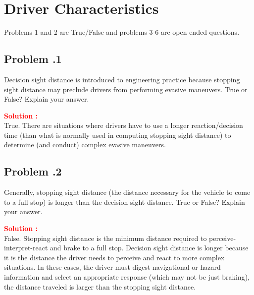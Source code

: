 \documentclass[12pt]{article}
\newcommand{\customsubsection}[1]{
  \subsection*{Problem \thesection.#1}
}
\begin{document}

\section{Driver Characteristics}
Problems 1 and 2 are True/False and problems 3-6 are open ended questions.


\customsubsection{1}
Decision sight distance is introduced to engineering practice because stopping sight distance may preclude drivers from performing evasive maneuvers. True or False? Explain your answer. 


\textbf{\textcolor{red}{Solution :}} \\
True. There are situations where drivers have to use a longer reaction/decision time (than what is normally used in computing stopping sight distance) to determine (and conduct) complex evasive maneuvers. 
\newpage

\customsubsection{2}
Generally, stopping sight distance (the distance necessary for the vehicle to come to a full stop) is longer than the decision sight distance. True or False? Explain your answer. 


\textbf{\textcolor{red}{Solution :}} \\
False. Stopping sight distance is the minimum distance required to perceive-interpret-react and brake to a full stop. Decision sight distance is longer because it is the distance the driver needs to perceive and react to more complex situations. In these cases, the driver must digest navigational or hazard information and select an appropriate response (which may not be just braking), the distance traveled is larger than the stopping sight distance.
\newpage
\end{document}
